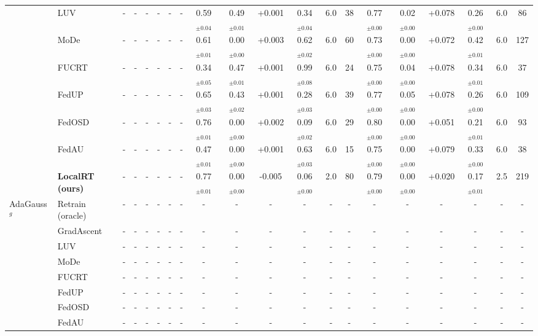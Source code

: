 \begin{table}[t]
\begin{tabular}{ll|cccccc|cccccc|cccccc}
 & LUV & - & - & - & - & - & - & 0.59$_{\pm0.04}$ & 0.49$_{\pm0.01}$ & +0.001 & 0.34$_{\pm0.04}$ & 6.0 & 38 & 0.77$_{\pm0.00}$ & 0.02$_{\pm0.00}$ & +0.078 & 0.26$_{\pm0.00}$ & 6.0 & 86\\
 & MoDe & - & - & - & - & - & - & 0.61$_{\pm0.01}$ & 0.00$_{\pm0.00}$ & +0.003 & 0.62$_{\pm0.02}$ & 6.0 & 60 & 0.73$_{\pm0.00}$ & 0.00$_{\pm0.00}$ & +0.072 & 0.42$_{\pm0.01}$ & 6.0 & 127\\
 & FUCRT & - & - & - & - & - & - & 0.34$_{\pm0.05}$ & 0.47$_{\pm0.01}$ & +0.001 & 0.99$_{\pm0.08}$ & 6.0 & 24 & 0.75$_{\pm0.00}$ & 0.04$_{\pm0.00}$ & +0.078 & 0.34$_{\pm0.01}$ & 6.0 & 37\\
 & FedUP & - & - & - & - & - & - & 0.65$_{\pm0.03}$ & 0.43$_{\pm0.02}$ & +0.001 & 0.28$_{\pm0.03}$ & 6.0 & 39 & 0.77$_{\pm0.00}$ & 0.05$_{\pm0.00}$ & +0.078 & 0.26$_{\pm0.00}$ & 6.0 & 109\\
 & FedOSD & - & - & - & - & - & - & 0.76$_{\pm0.01}$ & 0.00$_{\pm0.00}$ & +0.002 & 0.09$_{\pm0.02}$ & 6.0 & 29 & 0.80$_{\pm0.00}$ & 0.00$_{\pm0.00}$ & +0.051 & 0.21$_{\pm0.01}$ & 6.0 & 93\\
 & FedAU & - & - & - & - & - & - & 0.47$_{\pm0.01}$ & 0.00$_{\pm0.00}$ & +0.001 & 0.63$_{\pm0.03}$ & 6.0 & 15 & 0.75$_{\pm0.00}$ & 0.00$_{\pm0.00}$ & +0.079 & 0.33$_{\pm0.00}$ & 6.0 & 38\\
 & \textbf{LocalRT (ours)} & - & - & - & - & - & - & 0.77$_{\pm0.01}$ & 0.00$_{\pm0.00}$ & -0.005 & 0.06$_{\pm0.00}$ & 2.0 & 80 & 0.79$_{\pm0.00}$ & 0.00$_{\pm0.00}$ & +0.020 & 0.17$_{\pm0.01}$ & 2.5 & 219\\
\midrule
AdaGauss$^{g}$ & Retrain (oracle) & - & - & - & - & - & - & - & - & - & - & - & - & - & - & - & - & - & -\\
 & GradAscent & - & - & - & - & - & - & - & - & - & - & - & - & - & - & - & - & - & -\\
 & LUV & - & - & - & - & - & - & - & - & - & - & - & - & - & - & - & - & - & -\\
 & MoDe & - & - & - & - & - & - & - & - & - & - & - & - & - & - & - & - & - & -\\
 & FUCRT & - & - & - & - & - & - & - & - & - & - & - & - & - & - & - & - & - & -\\
 & FedUP & - & - & - & - & - & - & - & - & - & - & - & - & - & - & - & - & - & -\\
 & FedOSD & - & - & - & - & - & - & - & - & - & - & - & - & - & - & - & - & - & -\\
 & FedAU & - & - & - & - & - & - & - & - & - & - & - & - & - & - & - & - & - & -\\

\end{tabular}
\end{table}
